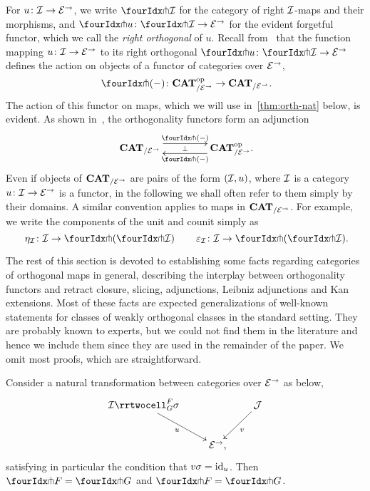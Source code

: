 \documentclass[reqno,10pt,a4paper,oneside,draft]{amsart}
\begin{document}
{{For  $u \co \cal{I} \to \catE^\to$, we write $\liftr{\cal{I}}$ for the category of right $\cal{I}$-maps and their morphisms, and 
$\liftr{u} \co \liftr{\cal{I}} \to \catE^\to$ for the evident forgetful functor, which we call the \emph{right orthogonal} of $u$. Recall from~\cite{garner:small-object-argument} that the function mapping $u \co \cal{I} \to \catE^\to$ to its right orthogonal $\liftr{u} \co \liftr{\cal{I}} \to \catE^\to$ defines the action on objects of a functor of categories over $\catE^\to$,
\[
  \liftr{\brarghole} \co \CAT_{/\catE^\to}^{\op} \to \CAT_{/\catE^\to} \rlap{.}
\]
The action of this functor on maps, which we will use in~\cref{thm:orth-nat} below, is evident.
As shown in~\cite[Proposition~3.8]{garner:small-object-argument}, the orthogonality functors form an adjunction
\begin{equation} \label{garner-adjunction}
\begin{gathered}
\xymatrix@C+2em{
  \CAT_{/\catE^\to}
  \ar@<5pt>[r]^-{\liftl{\brarghole}}
  \ar@{}[r]|-{\bot}
&
  \CAT_{/\catE^\to}^{\op} \rlap{.}
  \ar@<5pt>[l]^-{\liftr{\brarghole}}
}
\end{gathered}
\end{equation}
Even if objects of $\CAT_{/\catE^\to}$ are pairs of the form $(\cal{I}, u)$, where $\cal{I}$ is a category $u \co
\cal{I} \to \catE^\to$ is a functor, in the following we shall often refer to them simply by their domains. A similar convention applies
to maps in $\CAT_{/\catE^\to}$. For example, we write the components of the unit and counit simply as 
\[
\eta_\cal{I} \co \cal{I} \to \liftl{(\liftr{\cal{I})}} \, \qquad 
\varepsilon_\cal{I} \co \cal{I} \to \liftr{(\liftl{\cal{I}})} \rlap{.}
\]






The rest of this section is devoted to establishing some facts regarding categories of orthogonal maps in general, describing the interplay between orthogonality functors and retract closure, slicing, adjunctions, Leibniz adjunctions and Kan extensions. Most of these facts are expected generalizations of well-known statements for classes of weakly orthogonal classes in the standard setting.
They are probably known to experts, but we could not find them in the literature and hence we include them since they are used in the remainder of the paper. We omit  most proofs, which are straightforward. 

\begin{proposition} \label{thm:orth-nat}
Consider a natural transformation between categories over $\catE^\to$ as below,
\[
\xymatrix{
  \cal{I}
  \rrtwocell_G^F{\sigma}
 \ar[dr]_{u}
&&
  \cal{J}
  \ar[dl]^{v}
\\&
  \catE^\to
\rlap{,}}
\]
satisfying in particular the condition that $v \sigma = \id_u$.
Then $\liftr{F} = \liftr{G}$ and $\liftl{F} = \liftl{G}$.
\end{proposition}


}}
\end{document}
